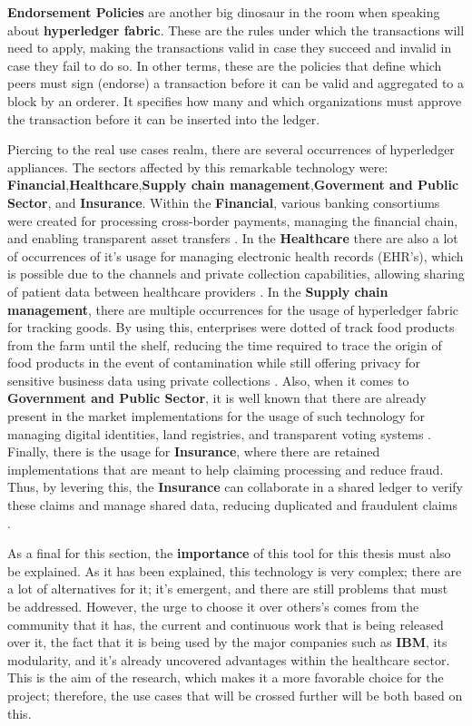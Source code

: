 \textbf {Endorsement Policies} are another big dinosaur in the room when speaking about \textbf{hyperledger fabric}. These are the rules under which the transactions will need to apply, making the transactions valid in case they succeed and invalid in case they fail to do so. In other terms, these are the policies that define which peers must sign (endorse) a transaction before it can be valid and aggregated to a block by an orderer. It specifies how many and which organizations must approve the transaction before it can be inserted into the ledger.

Piercing to the real use cases realm, there are several occurrences of hyperledger appliances. The sectors affected by this remarkable technology were: \textbf{Financial},\textbf{Healthcare},\textbf{Supply chain management},\textbf{Goverment and Public Sector}, and \textbf{Insurance}. Within the \textbf{Financial}, various banking consortiums were created for processing cross-border payments, managing the financial chain, and enabling transparent asset transfers \cite{finances-use-case}. In the \textbf{Healthcare} there are also a lot of occurrences of it's usage for managing electronic health records (EHR's), which is possible due to the channels and private collection capabilities, allowing sharing of patient data between healthcare providers \cite{healthcare-use-case}. In the \textbf{Supply chain management}, there are multiple occurrences for the usage of hyperledger fabric for tracking goods. By using this, enterprises were dotted of track food products from the farm until the shelf, reducing the time required to trace the origin of food products in the event of contamination while still offering privacy for sensitive business data using private collections \cite{supply-chain-use-case}. Also, when it comes to \textbf{Government and Public Sector}, it is well known that there are already present in the market implementations for the usage of such technology for managing digital identities, land registries, and transparent voting systems \cite{public-sector-use-case}. Finally, there is the usage for \textbf{Insurance}, where there are retained implementations that are meant to help claiming processing and reduce fraud. Thus, by levering this, the \textbf{Insurance} can collaborate in a shared ledger to verify these claims and manage shared data, reducing duplicated and fraudulent claims \cite{insurance-use-case}.

As a final for this section, the \textbf{importance} of this tool for this thesis must also be explained. As it has been explained, this technology is very complex; there are a lot of alternatives for it; it's emergent, and there are still problems that must be addressed. However, the urge to choose it over others's comes from the community that it has, the current and continuous work that is being released over it, the fact that it is being used by the major companies such as \textbf{IBM}, its modularity, and it's already uncovered advantages within the healthcare sector. This is the aim of the research, which makes it a more favorable choice for the project; therefore, the use cases that will be crossed further will be both based on this.

